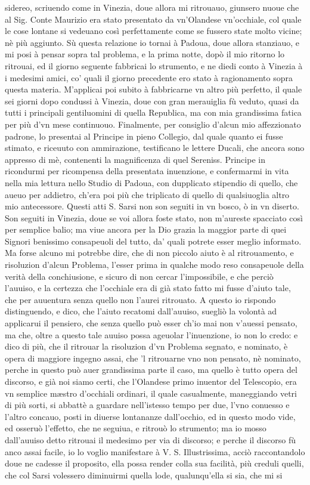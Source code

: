\documentclass[11pt,twoside,openany]{book}
\begin{document}
sidereo, scriuendo come in Vinezia, doue allora mi ritrouauo, giunsero nuoue che al Sig. Conte Maurizio era stato presentato da vn'Olandese vn'occhiale, col quale le cose lontane si vedeuano così perfettamente come se fussero state molto vicine; nè più aggiunto. Sù questa relazione io tornai à Padoua, doue allora stanziauo, e mi posi à pensar sopra tal problema, e la prima notte, dopò il mio ritorno lo ritrouai, ed il giorno seguente fabbricai lo strumento, e ne diedi conto à Vinezia à i medesimi amici, co' quali il giorno precedente ero stato à ragionamento sopra questa materia. M'applicai poi subito à fabbricarne vn altro più perfetto, il quale sei giorni dopo condussi à Vinezia, doue con gran merauiglia fù veduto, quasi da tutti i principali gentiluomini di quella Republica, ma con mia grandissima fatica per più d'vn mese continuouo. Finalmente, per consiglio d'alcun mio affezzionato padrone, lo presentai al Principe in pieno Collegio, dal quale quanto ei fusse stimato, e riceuuto con ammirazione, testificano le lettere Ducali, che ancora sono appresso di mè, contenenti la magnificenza di quel Sereniss. Principe in ricondurmi per ricompensa della presentata inuenzione, e confermarmi in vita nella mia lettura nello Studio di Padoua, con dupplicato stipendio di quello, che aueuo per addietro, ch'era poi più che triplicato di quello di qualsiuoglia altro mio antecessore. Questi atti S. Sarsi non son seguiti in vn bosco, ò in vn diserto. Son seguiti in Vinezia, doue se voi allora foste stato, non m'aureste spacciato così per semplice balio; ma viue ancora per la Dio grazia la maggior parte di quei Signori benissimo consapeuoli del tutto, da' quali potrete esser meglio informato. Ma forse alcuno mi potrebbe dire, che di non piccolo aiuto è al ritrouamento, e risoluzion d'alcun Problema, l'esser prima in qualche modo reso consapeuole della verità della conchiusione, e sicuro di non cercar l'impossibile, e che perciò l'auuiso, e la certezza che l'occhiale era di già stato fatto mi fusse d'aiuto tale, che per auuentura senza quello non l'aurei ritrouato. A questo io rispondo distinguendo, e dico, che l'aiuto recatomi dall'auuiso, suegliò la volontà ad applicarui il pensiero, che senza quello può esser ch'io mai non v'auessi pensato, ma che, oltre a questo tale auuiso possa ageuolar l'inuenzione, io non lo credo: e dico di più, che il ritrouar la risoluzion d'vn Problema segnato, e nominato, è opera di maggiore ingegno assai, che 'l ritrouarne vno non pensato, nè nominato, perche in questo può auer grandissima parte il caso, ma quello è tutto opera del discorso, e già noi siamo certi, che l'Olandese primo inuentor del Telescopio, era vn semplice mæstro d'occhiali ordinari, il quale casualmente, maneggiando vetri di più sorti, si abbattè a guardare nell'istesso tempo per due, l'vno conuesso e l'altro concauo, posti in diuerse lontananze dall'occhio, ed in questo modo vide, ed osseruò l'effetto, che ne seguiua, e ritrouò lo strumento; ma io mosso dall'auuiso detto ritrouai il medesimo per via di discorso; e perche il discorso fù anco assai facile, io lo voglio manifestare à V. S. Illustrissima, acciò raccontandolo doue ne cadesse il proposito, ella possa render colla sua facilità, più creduli quelli, che col Sarsi volessero diminuirmi quella lode, qualunqu'ella si sia, che mi si 
\end{document}
